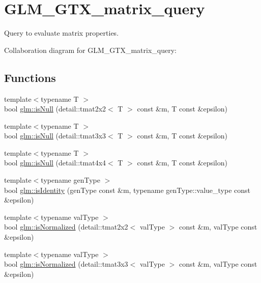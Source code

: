 \hypertarget{group__gtx__matrix__query}{}\section{G\+L\+M\+\_\+\+G\+T\+X\+\_\+matrix\+\_\+query}
\label{group__gtx__matrix__query}


Query to evaluate matrix properties.  


Collaboration diagram for G\+L\+M\+\_\+\+G\+T\+X\+\_\+matrix\+\_\+query\+:
\subsection*{Functions}
\begin{DoxyCompactItemize}
\item 
{\footnotesize template$<$typename T $>$ }\\bool \hyperlink{group__gtx__matrix__query_ga522ba657c5bf6a022c49b5717f2b600c}{glm\+::is\+Null} (detail\+::tmat2x2$<$ T $>$ const \&m, T const \&epsilon)
\item 
{\footnotesize template$<$typename T $>$ }\\bool \hyperlink{group__gtx__matrix__query_gaed0ae11694b42e395193800822e5c722}{glm\+::is\+Null} (detail\+::tmat3x3$<$ T $>$ const \&m, T const \&epsilon)
\item 
{\footnotesize template$<$typename T $>$ }\\bool \hyperlink{group__gtx__matrix__query_ga9669ffcd7d91aa8eb2ec421e2b9515c4}{glm\+::is\+Null} (detail\+::tmat4x4$<$ T $>$ const \&m, T const \&epsilon)
\item 
{\footnotesize template$<$typename gen\+Type $>$ }\\bool \hyperlink{group__gtx__matrix__query_ga5a899dff905871886d6f31517bd1fe30}{glm\+::is\+Identity} (gen\+Type const \&m, typename gen\+Type\+::value\+\_\+type const \&epsilon)
\item 
{\footnotesize template$<$typename val\+Type $>$ }\\bool \hyperlink{group__gtx__matrix__query_ga4db0eb631e14d23d597b93b80e324c5d}{glm\+::is\+Normalized} (detail\+::tmat2x2$<$ val\+Type $>$ const \&m, val\+Type const \&epsilon)
\item 
{\footnotesize template$<$typename val\+Type $>$ }\\bool \hyperlink{group__gtx__matrix__query_ga4cea149ceb3e528a45fb6cadbd1835bc}{glm\+::is\+Normalized} (detail\+::tmat3x3$<$ val\+Type $>$ const \&m, val\+Type const \&epsilon)

\end{DoxyCompactItemize}
